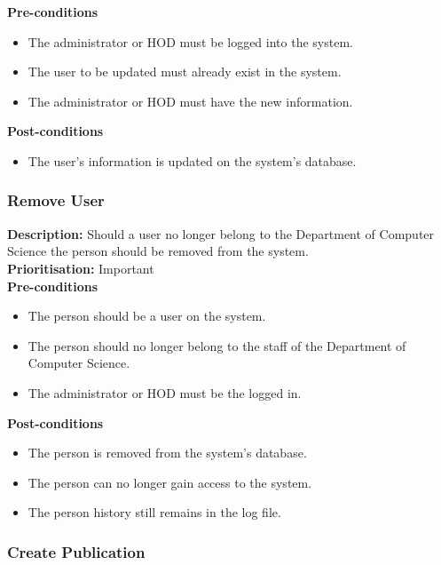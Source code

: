\documentclass[a4paper]{article}
\begin{document}
    \textbf{Pre-conditions}
     \begin{itemize}
        \item The administrator or HOD must be logged into the system.
        \item The user to be updated must already exist in the system.
        \item The administrator or HOD must have the new information.
   \end{itemize}
    
    \textbf{Post-conditions}
    \begin{itemize}
        \item The user's information is updated on the system's database.
    \end{itemize}
    
    \subsubsection{Remove User}
    
    \textbf{Description:} Should a user no longer belong to the Department of Computer Science the person should be removed from the system.\\
    \textbf{Prioritisation:} Important\\
    
    \textbf{Pre-conditions}
     \begin{itemize}
        \item The person should be a user on the system.
        \item The person should no longer belong to the staff of the Department of Computer Science.
        \item The administrator or HOD must be the logged in.
   \end{itemize}
    
    \textbf{Post-conditions}
    \begin{itemize}
        \item The person is removed from the system's database.
        \item The person can no longer gain access to the system.
        \item The person history still remains in the log file.
    \end{itemize}

    \subsubsection{Create Publication}
    
\end{document}
